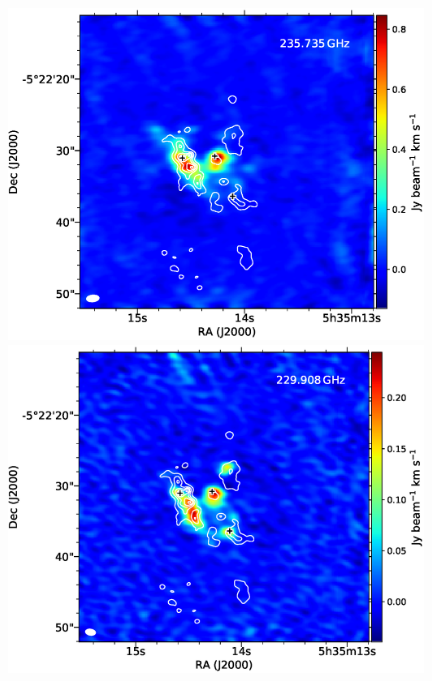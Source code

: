 \newpage

\begin{figure}[htbp] 
\begin{center}
\begin{minipage}{0.98\textwidth} 
\begin{center}
\begin{minipage}{0.48\textwidth}
\begin{center}
\includegraphics[width=0.98\textwidth]{OrionKL/mom0/235.735mom0_3-7.eps}
\end{center}
\end{minipage}
\begin{minipage}{0.48\textwidth}
\begin{center}
\includegraphics[width=0.98\textwidth]{OrionKL/mom0/229.908mom0_3-7.eps}
\end{center}
\end{minipage}
\end{center}
\end{minipage}


\end{center}
\end{figure}

